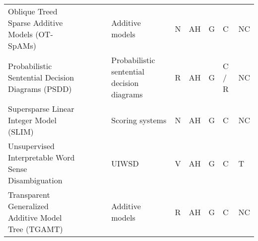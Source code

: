 \documentclass[final,1p,times]{elsarticle}
\begin{document}
\begin{table}[htbp]
\begin{tabular}{m{2cm} m{1.5cm} m{0.5cm} m{0.5cm} m{1.5cm} m{0.85cm} m{0.5cm} m{0.6cm} m{0.8cm} m{0.7cm}}
    Oblique Treed Sparse Additive Models (OT-SpAMs) &  \citeauthor{wang2015trading} &  \cite{wang2015trading} &  \citeyear{wang2015trading} & Additive models & N & AH & G & C & NC\\
    Probabilistic Sentential Decision Diagrams (PSDD) &  \citeauthor{liang2017towards} &  \cite{liang2017towards} &  \citeyear{liang2017towards} & Probabilistic sentential decision diagrams & R & AH & G & C / R & NC\\
    Supersparse Linear Integer Model (SLIM) &  \citeauthor{ustun2014supersparse} &  \cite{ustun2014supersparse} &  \citeyear{ustun2014supersparse} & Scoring systems & N & AH & G & C & NC\\
    Unsupervised Interpretable Word Sense Disambiguation &  \citeauthor{panchenko2017unsupervised} &  \cite{panchenko2017unsupervised} &  \citeyear{panchenko2017unsupervised} & UIWSD & V & AH & G & C & T\\
    Transparent Generalized Additive Model Tree (TGAMT) &  \citeauthor{fahner2018developing} &  \cite{fahner2018developing} &  \citeyear{fahner2018developing} & Additive models & R & AH & G & C & NC\\
    \hline
\end{tabular}
\end{table}
\end{document}
